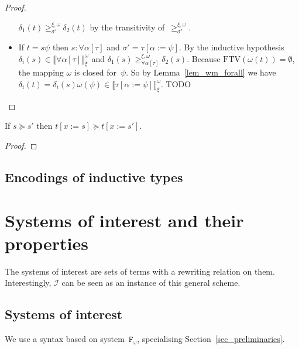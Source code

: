 \documentclass[runningheads,a4paper]{llncs}
\newcommand{\Fomega}{\mathtt{F}_\omega}
\newcommand{\Iterms}{\mathcal{I}}
\newcommand{\subst}[2]{#1:=#2}
\newcommand{\FTV}{\mathrm{FTV}}
\newcommand{\val}[3]{\ensuremath{\llbracket#1\rrbracket_{#2}^{#3}}}
\newcommand{\gteq}[3]{\ensuremath{\ge_{#1}^{#2,#3}}}
\begin{document}
\begin{proof}
\begin{itemize}
    $\delta_1(t)\gteq{\sigma'}{\xi}{\omega}\delta_2(t)$ by the
    transitivity of~$\gteq{\sigma'}{\xi}{\omega}$.
  \item If $t = s \psi$ then $s : \forall\alpha[\tau]$ and $\sigma' =
    \tau[\subst{\alpha}{\psi}]$. By the inductive hypothesis
    $\delta_i(s) \in \val{\forall\alpha[\tau]}{\xi}{\omega}$ and
    $\delta_1(s) \gteq{\forall\alpha[\tau]}{\xi}{\omega}
    \delta_2(s)$. Because $\FTV(\omega(t)) = \emptyset$, the mapping
    $\omega$ is closed for~$\psi$. So by Lemma~\ref{lem_wm_forall} we
    have $\delta_i(t) = \delta_i(s) \omega(\psi) \in
    \val{\tau[\subst{\alpha}{\psi}]}{\xi}{\omega}$. TODO
  \end{itemize}
\end{proof}

\begin{lemma}\label{lem_succeq_subst}
  If $s \succeq s'$ then $t[\subst{x}{s}] \succeq t[\subst{x}{s'}]$.
\end{lemma}

\begin{proof}
\end{proof}

\subsection{Encodings of inductive types}\label{sec_encodings}


\section{Systems of interest and their properties}\label{sec:systems}

The systems of interest are sets of terms with a rewriting relation on
them. Interestingly, $\Iterms$ can be seen as an instance of this
general scheme.

\subsection{Systems of interest}

We use a syntax based on system~$\Fomega$, specialising
Section~\ref{sec_preliminaries}.
\end{document}
